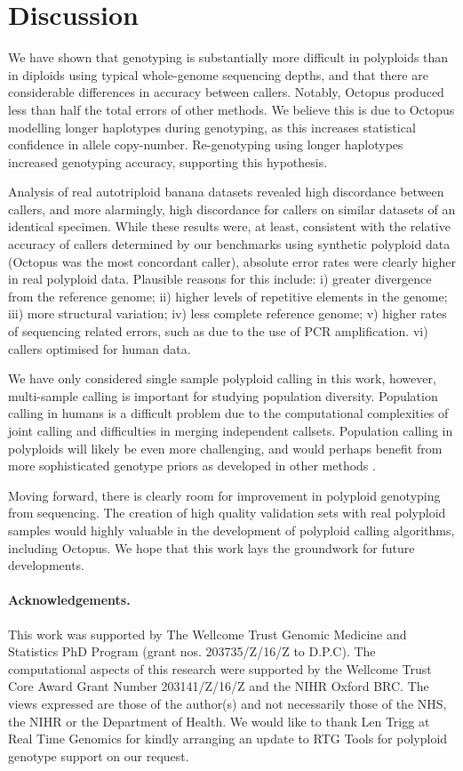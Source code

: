 \documentclass[notitlepage, twocolumn, 10pt]{article}
\begin{document}
\section*{Discussion}

We have shown that genotyping is substantially more difficult in polyploids than in diploids using typical whole-genome sequencing depths, and that there are considerable differences in accuracy between callers. Notably, Octopus produced less than half the total errors of other methods. We believe this is due to Octopus modelling longer haplotypes during genotyping, as this increases statistical confidence in allele copy-number. Re-genotyping using longer haplotypes increased genotyping accuracy, supporting this hypothesis.

Analysis of real autotriploid banana datasets revealed high discordance between callers, and more alarmingly, high discordance for callers on similar datasets of an identical specimen. While these results were, at least, consistent with the relative accuracy of callers determined by our benchmarks using synthetic polyploid data (Octopus was the most concordant caller), absolute error rates were clearly higher in real polyploid data. Plausible reasons for this include: i) greater divergence from the reference genome; ii) higher levels of repetitive elements in the genome; iii) more structural variation; iv) less complete reference genome; v) higher rates of sequencing related errors, such as due to the use of PCR amplification. vi) callers optimised for human data.

We have only considered single sample polyploid calling in this work, however, multi-sample calling is  important for studying population diversity. Population calling in humans is a difficult problem due to the computational complexities of joint calling and difficulties in merging independent callsets. Population calling in polyploids will likely be even more challenging, and would perhaps benefit from  more sophisticated genotype priors as developed in other methods \cite{RN666}.

Moving forward, there is clearly room for improvement in polyploid genotyping from sequencing. The creation of high quality validation sets with real polyploid samples would highly valuable in the development of polyploid calling algorithms, including Octopus. We hope that this work lays the groundwork for future developments.

\paragraph*{Acknowledgements.} This work was supported by The Wellcome Trust Genomic Medicine and Statistics PhD Program (grant nos. 203735/Z/16/Z to D.P.C). The computational aspects of this research were supported by the Wellcome Trust Core Award Grant Number 203141/Z/16/Z and the NIHR Oxford BRC. The views expressed are those of the author(s) and not necessarily those of the NHS, the NIHR or the Department of Health. We would like to thank Len Trigg at Real Time Genomics for kindly arranging an update to RTG Tools for polyploid genotype support on our request.
\end{document}
